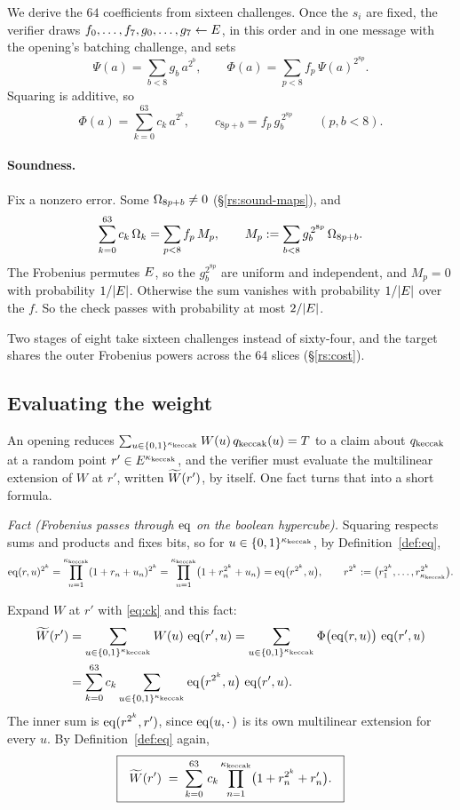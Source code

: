We derive the $64$ coefficients from sixteen challenges. Once the $s_i$ are fixed, the verifier draws $f_0,\dots,f_7,g_0,\dots,g_7\leftarrow E$, in this order and in one message with the opening's batching challenge, and sets
\begin{equation}
\Psi(a)=\sum_{b<8}g_b\,a^{2^b},
\qquad
\Phi(a)=\sum_{p<8}f_p\,\Psi(a)^{2^{8p}}.
\label{eq:phi}
\end{equation}
Squaring is additive, so
\begin{equation}
\Phi(a)=\sum_{k=0}^{63}c_k\,a^{2^k},
\qquad
c_{8p+b}=f_p\,g_b^{\,2^{8p}}\qquad(p,b<8).
\label{eq:ck}
\end{equation}

\paragraph{Soundness.} Fix a nonzero error. Some $\Omega_{8p+b}\neq0$ (\S\ref{rs:sound-maps}), and
\[
\sum_{k=0}^{63}c_k\,\Omega_k=\sum_{p<8}f_p\,M_p,
\qquad
M_p:=\sum_{b<8}g_b^{\,2^{8p}}\,\Omega_{8p+b}.
\]
The Frobenius permutes $E$, so the $g_b^{2^{8p}}$ are uniform and independent, and $M_p=0$ with probability $1/|E|$. Otherwise the sum vanishes with probability $1/|E|$ over the $f$. So the check passes with probability at most $2/|E|$.

Two stages of eight take sixteen challenges instead of sixty-four, and the target shares the outer Frobenius powers across the $64$ slices (\S\ref{rs:cost}).

\subsection{Evaluating the weight}\label{rs:weight}

An opening reduces $\sum_{u\in\{0,1\}^{\kappa_{\mathrm{keccak}}}}W(u)\,q_{\mathrm{keccak}}(u)=T$ to a claim about $q_{\mathrm{keccak}}$ at a random point $r'\in E^{\kappa_{\mathrm{keccak}}}$, and the verifier must evaluate the multilinear extension of $W$ at $r'$, written $\widetilde{W}(r')$, by itself. One fact turns that into a short formula.

\emph{Fact (Frobenius passes through $\operatorname{eq}$ on the boolean hypercube).} Squaring respects sums and products and fixes bits, so for $u\in\{0,1\}^{\kappa_{\mathrm{keccak}}}$, by Definition~\ref{def:eq},
\[
\operatorname{eq}(r,u)^{2^k}=\prod_{n=1}^{\kappa_{\mathrm{keccak}}}(1+r_n+u_n)^{2^k}=\prod_{n=1}^{\kappa_{\mathrm{keccak}}}\bigl(1+r_n^{2^k}+u_n\bigr)=\operatorname{eq}\bigl(r^{2^k},u\bigr),
\qquad r^{2^k}:=\bigl(r_1^{2^k},\dots,r_{\kappa_{\mathrm{keccak}}}^{2^k}\bigr).
\]

Expand $W$ at $r'$ with \eqref{eq:ck} and this fact:
\[
\begin{aligned}
\widetilde{W}(r')&=\sum_{u\in\{0,1\}^{\kappa_{\mathrm{keccak}}}}W(u)\,\operatorname{eq}(r',u)
=\sum_{u\in\{0,1\}^{\kappa_{\mathrm{keccak}}}}\Phi\bigl(\operatorname{eq}(r,u)\bigr)\,\operatorname{eq}(r',u)\\
&=\sum_{k=0}^{63}c_k\sum_{u\in\{0,1\}^{\kappa_{\mathrm{keccak}}}}\operatorname{eq}\bigl(r^{2^k},u\bigr)\,\operatorname{eq}(r',u).
\end{aligned}
\]
The inner sum is $\operatorname{eq}(r^{2^k},r')$, since $\operatorname{eq}(u,\cdot\,)$ is its own multilinear extension for every $u$. By Definition~\ref{def:eq} again,
\[
\boxed{\ \
\widetilde{W}(r') \;=\; \sum_{k=0}^{63}\, c_k \prod_{n=1}^{\kappa_{\mathrm{keccak}}}
\bigl( 1 + r_n^{2^k} + r'_n \bigr).
\ \ }
\]

